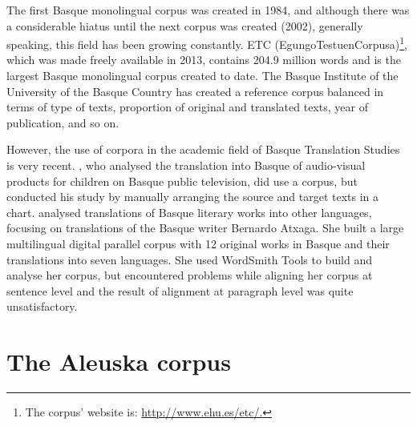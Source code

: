 \documentclass[output=paper]{LSP/langsci}
\begin{document}
The first Basque monolingual corpus was created in 1984, and although there was a considerable hiatus until the next corpus was created (2002), generally speaking, this field has been growing constantly. ETC (EgungoTestuenCorpusa)\footnote{The corpus' website is: \url{http://www.ehu.es/etc/.}}, which was made freely available in 2013, contains 204.9 million words and is the largest Basque monolingual corpus created to date. The Basque Institute of the University of the Basque Country has created a reference corpus balanced in terms of type of texts, proportion of original and translated texts, year of publication, and so on.

However, the use of corpora in the academic field of Basque Translation Studies is very recent. \citet{Barambones2012}, who analysed the translation into Basque of audio-visual products for children on Basque public television, did use a corpus, but conducted his study by manually arranging the source and target texts in a chart. \citet{Manterola2011} analysed translations of Basque literary works into other languages, focusing on translations of the Basque writer Bernardo Atxaga. She built a large multilingual digital parallel corpus with 12 original works in Basque and their translations into seven languages. She used WordSmith Tools \citep{Scott2004} to build and analyse her corpus, but encountered problems while aligning her corpus at sentence level and the result of alignment at paragraph level was quite unsatisfactory.

\section{The Aleuska corpus}
\end{document}
